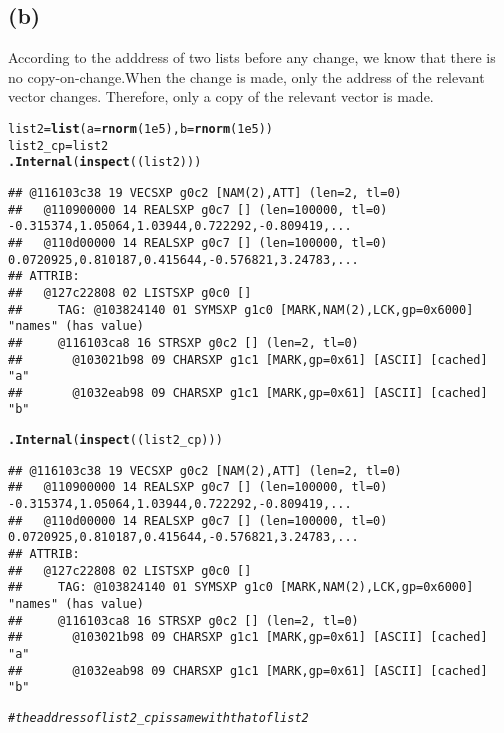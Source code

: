 \documentclass{article}\usepackage[]{graphicx}\usepackage[]{color}
\makeatletter
\newcommand{\hlnum}[1]{\textcolor[rgb]{0.686,0.059,0.569}{#1}}%
\newcommand{\hlcom}[1]{\textcolor[rgb]{0.678,0.584,0.686}{\textit{#1}}}%
\newcommand{\hlstd}[1]{\textcolor[rgb]{0.345,0.345,0.345}{#1}}%
\newcommand{\hlkwb}[1]{\textcolor[rgb]{0.69,0.353,0.396}{#1}}%
\newcommand{\hlkwc}[1]{\textcolor[rgb]{0.333,0.667,0.333}{#1}}%
\newcommand{\hlkwd}[1]{\textcolor[rgb]{0.737,0.353,0.396}{\textbf{#1}}}%
\newenvironment{kframe}{%
 \def\at@end@of@kframe{}%
 \ifinner\ifhmode%
  \def\at@end@of@kframe{\end{minipage}}%
  \begin{minipage}{\columnwidth}%
 \fi\fi%
 \def\FrameCommand##1{\hskip\@totalleftmargin \hskip-\fboxsep
 \colorbox{shadecolor}{##1}\hskip-\fboxsep
     \hskip-\linewidth \hskip-\@totalleftmargin \hskip\columnwidth}%
 \MakeFramed {\advance\hsize-\width
   \@totalleftmargin\z@ \linewidth\hsize
   \@setminipage}}%
 {\par\unskip\endMakeFramed%
 \at@end@of@kframe}
\newenvironment{knitrout}{}{} %
\makeatother
\begin{document}
\subsection{(b)}
According to the adddress of two lists before any change, we know that there is no copy-on-change.When the change is made, only the address of the relevant vector changes. Therefore, only a copy of the relevant vector is made.
\begin{knitrout}
\color{fgcolor}\begin{kframe}
\begin{alltt}
\hlstd{list2}\hlkwb{=}\hlkwd{list}\hlstd{(}\hlkwc{a}\hlstd{=}\hlkwd{rnorm}\hlstd{(}\hlnum{1e5}\hlstd{),}\hlkwc{b}\hlstd{=}\hlkwd{rnorm}\hlstd{(}\hlnum{1e5}\hlstd{))}
\hlstd{list2_cp}\hlkwb{=}\hlstd{list2}
\hlkwd{.Internal}\hlstd{(}\hlkwd{inspect}\hlstd{((list2)))}
\end{alltt}
\begin{verbatim}
## @116103c38 19 VECSXP g0c2 [NAM(2),ATT] (len=2, tl=0)
##   @110900000 14 REALSXP g0c7 [] (len=100000, tl=0) -0.315374,1.05064,1.03944,0.722292,-0.809419,...
##   @110d00000 14 REALSXP g0c7 [] (len=100000, tl=0) 0.0720925,0.810187,0.415644,-0.576821,3.24783,...
## ATTRIB:
##   @127c22808 02 LISTSXP g0c0 [] 
##     TAG: @103824140 01 SYMSXP g1c0 [MARK,NAM(2),LCK,gp=0x6000] "names" (has value)
##     @116103ca8 16 STRSXP g0c2 [] (len=2, tl=0)
##       @103021b98 09 CHARSXP g1c1 [MARK,gp=0x61] [ASCII] [cached] "a"
##       @1032eab98 09 CHARSXP g1c1 [MARK,gp=0x61] [ASCII] [cached] "b"
\end{verbatim}
\begin{alltt}
\hlkwd{.Internal}\hlstd{(}\hlkwd{inspect}\hlstd{((list2_cp)))}
\end{alltt}
\begin{verbatim}
## @116103c38 19 VECSXP g0c2 [NAM(2),ATT] (len=2, tl=0)
##   @110900000 14 REALSXP g0c7 [] (len=100000, tl=0) -0.315374,1.05064,1.03944,0.722292,-0.809419,...
##   @110d00000 14 REALSXP g0c7 [] (len=100000, tl=0) 0.0720925,0.810187,0.415644,-0.576821,3.24783,...
## ATTRIB:
##   @127c22808 02 LISTSXP g0c0 [] 
##     TAG: @103824140 01 SYMSXP g1c0 [MARK,NAM(2),LCK,gp=0x6000] "names" (has value)
##     @116103ca8 16 STRSXP g0c2 [] (len=2, tl=0)
##       @103021b98 09 CHARSXP g1c1 [MARK,gp=0x61] [ASCII] [cached] "a"
##       @1032eab98 09 CHARSXP g1c1 [MARK,gp=0x61] [ASCII] [cached] "b"
\end{verbatim}
\begin{alltt}
\hlcom{#the address of list2_cp is same with that of list2}

\end{alltt}
\end{kframe}
\end{knitrout}
\end{document}
